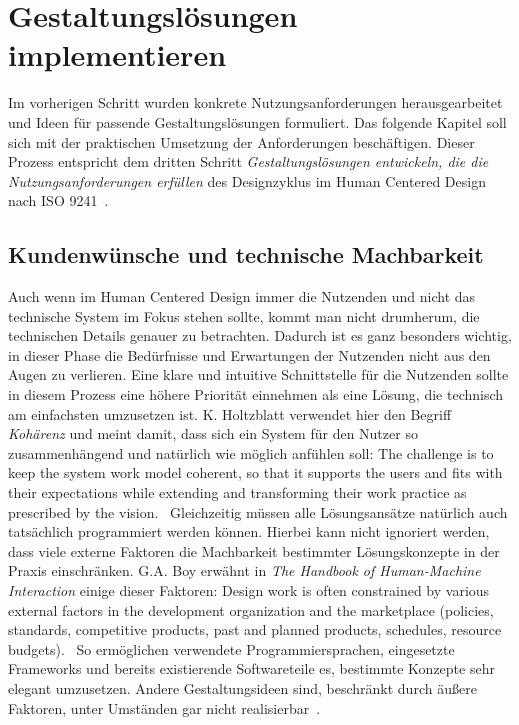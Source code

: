 \chapter{Gestaltungslösungen implementieren}
\label{chapter:implementation}

Im vorherigen Schritt wurden konkrete Nutzungsanforderungen herausgearbeitet
und Ideen für passende Gestaltungslösungen formuliert. Das folgende
Kapitel soll sich mit der praktischen Umsetzung der Anforderungen beschäftigen.
Dieser Prozess entspricht dem dritten Schritt \textit{Gestaltungslösungen
    entwickeln, die die Nutzungsanforderungen erfüllen} des Designzyklus im Human
Centered Design nach ISO 9241~\cite{ISO9241}.

\section{Kundenwünsche und technische Machbarkeit}
Auch wenn im Human Centered Design immer die Nutzenden und nicht das technische
System im Fokus stehen sollte, kommt man nicht drumherum, die technischen
Details genauer zu betrachten. Dadurch ist es ganz besonders wichtig, in dieser
Phase die Bedürfnisse und Erwartungen der Nutzenden nicht aus den Augen zu
verlieren. Eine klare und intuitive Schnittstelle für die Nutzenden sollte in
diesem Prozess eine höhere Priorität einnehmen als eine Lösung, die technisch
am einfachsten umzusetzen ist. K. Holtzblatt verwendet hier den Begriff
\textit{Kohärenz} und meint damit, dass sich ein System für den Nutzer so
zusammenhängend und natürlich wie möglich anfühlen soll: \glqq{}The challenge
is to keep the system work model coherent, so that it supports the users and
fits with their expectations while extending and transforming their work
practice as prescribed by the vision.\grqq{}~\cite{contextualDesign}
Gleichzeitig müssen alle Lösungsansätze natürlich auch tatsächlich programmiert
werden können. Hierbei kann nicht ignoriert werden, dass viele externe Faktoren
die Machbarkeit bestimmter Lösungskonzepte in der Praxis einschränken. G.A. Boy
erwähnt in \textit{The Handbook of Human-Machine Interaction} einige dieser
Faktoren: \glqq{}Design work is often constrained by various external factors
in the development organization and the marketplace (policies, standards,
competitive products, past and planned products, schedules, resource
budgets).\grqq~\cite{HMI-HCD} So ermöglichen verwendete Programmiersprachen,
eingesetzte Frameworks und bereits existierende Softwareteile es, bestimmte
Konzepte sehr elegant umzusetzen. Andere Gestaltungsideen sind, beschränkt
durch äußere Faktoren, unter Umständen gar nicht realisierbar~\cite{HMI-HCD}.

